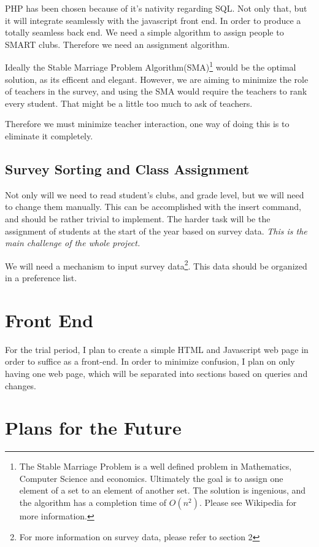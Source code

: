 \documentclass{article}
\begin{document}
PHP has been chosen because of it's nativity regarding SQL. Not only that, but it will integrate seamlessly with the javascript front end. In 
order to produce a totally seamless back end. We need a simple algorithm to assign people to SMART clubs. Therefore we need an assignment algorithm. 

Ideally the Stable Marriage Problem Algorithm(SMA)\footnote{The Stable Marriage Problem is a well defined problem in Mathematics, Computer 
Science 
and economics. Ultimately the goal is to assign one element of a set to an element of another set. The solution is ingenious, and the algorithm 
has a completion time of $O(n^2)$. Please see Wikipedia for more information.} would be the optimal solution, as its efficent and elegant.
However, we are aiming to minimize the role of teachers in the survey, and using the SMA would require the teachers to rank every student. 
That might be a little too much to ask of teachers. 

Therefore we must minimize teacher interaction, one way of doing this is to eliminate it completely. 

\subsection{Survey Sorting and Class Assignment}
Not only will we need to read student's clubs, and grade level, but we will need to change them manually. This can be accomplished with the 
insert command, and should be rather trivial to implement. The harder task will be the assignment of students at the start of the year based on 
survey data. \emph{This is the main challenge of the whole project.}

We will need a mechanism to input survey data\footnote{For more information on survey data, please refer to section 2}. This data should be 
organized in a preference list. 
\section{Front End}
For the trial period, I plan to create a simple HTML and Javascript web page in order to suffice as a front-end. In order to minimize 
confusion, I plan on only having one web page, which will be separated into sections based on queries and changes. 
\section{Plans for the Future}
\end{document}
